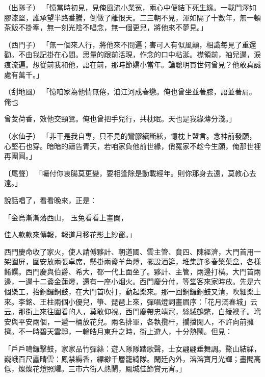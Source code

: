 \begin{showcontents}{}
（出隊子）  「憶當時初見，見俺風流小業冤，兩心中便結下死生緣。一載門澤如膠漆堅，誰承望半路番騰，倒做了離恨天。二三朝不見，渾如隔了十數年，無一頓茶飯不掛牽，無一刻光陰不唱念，無一個更兒，將他來不夢見。」

（西門子）  「無一個來人行，將他來不問遍；害可人有似風顛，相識每見了重還勸。不由我記掛在心間。思量的跟前活現，作念的口中粘涎。襟領前，袖兒邊，淚痕流遍。想從前我和他，語在前，那時節嬌小當年。論聰明貫世何曾見？他敢真誠處有萬千。」

（刮地風）  「憶咱家為他情無倦，洎江河成春戀。俺也曾坐並著膝，語並著肩。俺也

曾芰荷香，效他交頸鴛。俺也曾把手兒行，共枕眠。天也是我緣薄分淺。」

（水仙子）  「非干是我自專，只不見的鸞膠續斷絃，憶枕上盟言。念神前發願，心堅石也穿。暗暗的禱告青天，若咱家負他前世緣，俏冤家不趁今生願，俺那世裡再團圓。」

〔尾聲〕  「囑付你衷腸莫更變，要相逢除是動載經年。則你那身去遠，莫教心去遠。」

說話唱了，看看晚來，正是：

「金烏漸漸落西山，  玉兔看看上畫闌，

佳人款款來傳報，報道月移花影上紗窗。」

西門慶命收了家火，使人請傅夥計、朝道國、雲主管、賁四、陳經濟，大門首用一架圍屏，圍安放兩張卓席，懸掛兩盞羊角燈，擺設酒筵，堆集許多春檠菓盒，各樣餚饌。西門慶與伯爵、希大，都一代上面坐了。夥計、主管，兩邊打橫。大門首兩邊，一邊十二盞金蓮燈，還有一座小烟火。西門慶分付，等堂客來家時放。先是六個樂工，抬銅鑼銅鼓，在大門首吹打，動起樂來。那一回銅鑼銅鼓又清，吹細樂上來。李銘、王柱兩個小優兒，箏、琵琶上來，彈唱燈詞畫眉序：「花月滿春城」云云。那街上來往圍看的人，莫敢仰視。西門慶帶忠靖冠，絲絨鶴氅，白綾襖子。玳安與平安兩個，一遞一桶放花兒。兩名排軍，各執攬杆，攔擋閑人，不許向前擁擠。不一時碧天雲靜，一輪皓月東升之時，街上遊人，十分熱鬧。但見：

「戶戶嗚鑼擊鼓，家家品竹彈絲：遊人隊隊踏歌聲，士女翩翩垂舞調。鰲山結綵，巍峨百尺矗晴雲：鳳禁縟香，縹緲千層籠綺隊。閑廷內外，溶溶寶月光輝；畫閣高低，燦燦花燈照耀。三市六街人熱鬧，鳳城佳節賞元宵。」


\end{showcontents}
